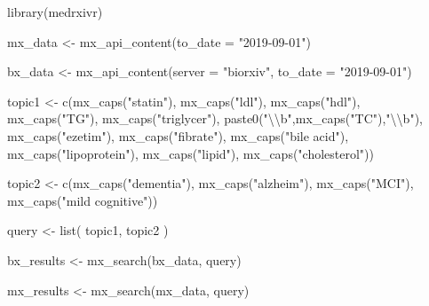 \documentclass[a4paper, twoside]{templates/ociamthesis}
\newenvironment{Shaded}{\begin{snugshade}}{\end{snugshade}}
\newcommand{\AttributeTok}[1]{\textcolor[rgb]{0.77,0.63,0.00}{#1}}
\newcommand{\FunctionTok}[1]{\textcolor[rgb]{0.00,0.00,0.00}{#1}}
\newcommand{\NormalTok}[1]{#1}
\newcommand{\OtherTok}[1]{\textcolor[rgb]{0.56,0.35,0.01}{#1}}
\newcommand{\SpecialCharTok}[1]{\textcolor[rgb]{0.00,0.00,0.00}{#1}}
\newcommand{\StringTok}[1]{\textcolor[rgb]{0.31,0.60,0.02}{#1}}
\renewenvironment{Shaded}
{
  \vspace{4pt}%
  \begin{snugshade}%
}{%
  \end{snugshade}%
  \vspace{4pt}%
}
\begin{document}
\begin{Shaded}
\begin{Highlighting}[]
\FunctionTok{library}\NormalTok{(medrxivr)}

\NormalTok{mx\_data }\OtherTok{\textless{}{-}} \FunctionTok{mx\_api\_content}\NormalTok{(}\AttributeTok{to\_date =} \StringTok{"2019{-}09{-}01"}\NormalTok{)}

\NormalTok{bx\_data }\OtherTok{\textless{}{-}} \FunctionTok{mx\_api\_content}\NormalTok{(}\AttributeTok{server =} \StringTok{"biorxiv"}\NormalTok{,}
                                    \AttributeTok{to\_date =} \StringTok{"2019{-}09{-}01"}\NormalTok{)}

\NormalTok{topic1 }\OtherTok{\textless{}{-}} \FunctionTok{c}\NormalTok{(}\FunctionTok{mx\_caps}\NormalTok{(}\StringTok{"statin"}\NormalTok{),}
            \FunctionTok{mx\_caps}\NormalTok{(}\StringTok{"ldl"}\NormalTok{),}
            \FunctionTok{mx\_caps}\NormalTok{(}\StringTok{"hdl"}\NormalTok{),}
            \FunctionTok{mx\_caps}\NormalTok{(}\StringTok{"TG"}\NormalTok{),}
            \FunctionTok{mx\_caps}\NormalTok{(}\StringTok{"triglycer"}\NormalTok{),}
            \FunctionTok{paste0}\NormalTok{(}\StringTok{"}\SpecialCharTok{\textbackslash{}\textbackslash{}}\StringTok{b"}\NormalTok{,}\FunctionTok{mx\_caps}\NormalTok{(}\StringTok{"TC"}\NormalTok{),}\StringTok{"}\SpecialCharTok{\textbackslash{}\textbackslash{}}\StringTok{b"}\NormalTok{),}
            \FunctionTok{mx\_caps}\NormalTok{(}\StringTok{"ezetim"}\NormalTok{),}
            \FunctionTok{mx\_caps}\NormalTok{(}\StringTok{"fibrate"}\NormalTok{),}
            \FunctionTok{mx\_caps}\NormalTok{(}\StringTok{"bile acid"}\NormalTok{),}
            \FunctionTok{mx\_caps}\NormalTok{(}\StringTok{"lipoprotein"}\NormalTok{),}
            \FunctionTok{mx\_caps}\NormalTok{(}\StringTok{"lipid"}\NormalTok{),}
            \FunctionTok{mx\_caps}\NormalTok{(}\StringTok{"cholesterol"}\NormalTok{))}

\NormalTok{topic2 }\OtherTok{\textless{}{-}} \FunctionTok{c}\NormalTok{(}\FunctionTok{mx\_caps}\NormalTok{(}\StringTok{"dementia"}\NormalTok{),}
            \FunctionTok{mx\_caps}\NormalTok{(}\StringTok{"alzheim"}\NormalTok{),}
            \FunctionTok{mx\_caps}\NormalTok{(}\StringTok{"MCI"}\NormalTok{),}
            \FunctionTok{mx\_caps}\NormalTok{(}\StringTok{"mild cognitive"}\NormalTok{))}

\NormalTok{query }\OtherTok{\textless{}{-}} \FunctionTok{list}\NormalTok{(}
\NormalTok{  topic1,}
\NormalTok{  topic2}
\NormalTok{)}

\NormalTok{bx\_results }\OtherTok{\textless{}{-}} \FunctionTok{mx\_search}\NormalTok{(bx\_data, query)}


\NormalTok{mx\_results }\OtherTok{\textless{}{-}} \FunctionTok{mx\_search}\NormalTok{(mx\_data, query)}
\end{Highlighting}
\end{Shaded}
\end{document}
